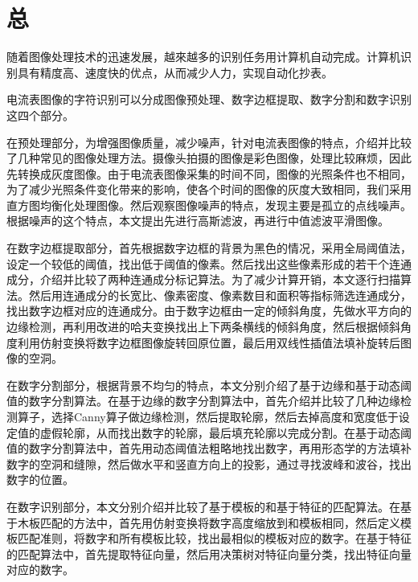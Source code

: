 
\chapter*{总}

随着图像处理技术的迅速发展，越來越多的识别任务用计算机自动完成。计算机识别具有精度高、速度快的优点，从而减少人力，实现自动化抄表。

电流表图像的字符识别可以分成图像预处理、数字边框提取、数字分割和数字识别这四个部分。

在预处理部分，为增强图像质量，减少噪声，针对电流表图像的特点，介绍并比较了几种常见的图像处理方法。摄像头拍摄的图像是彩色图像，处理比较麻烦，因此先转换成灰度图像。由于电流表图像采集的时间不同，图像的光照条件也不相同，为了减少光照条件变化带来的影响，使各个时间的图像的灰度大致相同，我们采用直方图均衡化处理图像。然后观察图像噪声的特点，发现主要是孤立的点线噪声。根据噪声的这个特点，本文提出先进行高斯滤波，再进行中值滤波平滑图像。

在数字边框提取部分，首先根据数字边框的背景为黑色的情况，采用全局阈值法，设定一个较低的阈值，找出低于阈值的像素。然后找出这些像素形成的若干个连通成分，介绍并比较了两种连通成分标记算法。为了减少计算开销，本文逐行扫描算法。然后用连通成分的长宽比、像素密度、像素数目和面积等指标筛选连通成分，找出数字边框对应的连通成分。由于数字边框由一定的倾斜角度，先做水平方向的边缘检测，再利用改进的哈夫变换找出上下两条横线的倾斜角度，然后根据倾斜角度利用仿射变换将数字边框图像旋转回原位置，最后用双线性插值法填补旋转后图像的空洞。

在数字分割部分，根据背景不均匀的特点，本文分别介绍了基于边缘和基于动态阈值的数字分割算法。在基于边缘的数字分割算法中，首先介绍并比较了几种边缘检测算子，选择Canny算子做边缘检测，然后提取轮廓，然后去掉高度和宽度低于设定值的虚假轮廓，从而找出数字的轮廓，最后填充轮廓以完成分割。在基于动态阈值的数字分割算法中，首先用动态阈值法粗略地找出数字，再用形态学的方法填补数字的空洞和缝隙，然后做水平和竖直方向上的投影，通过寻找波峰和波谷，找出数字的位置。

在数字识别部分，本文分别介绍并比较了基于模板的和基于特征的匹配算法。在基于木板匹配的方法中，首先用仿射变换将数字高度缩放到和模板相同，然后定义模板匹配准则，将数字和所有模板比较，找出最相似的模板对应的数字。在基于特征的匹配算法中，首先提取特征向量，然后用决策树对特征向量分类，找出特征向量对应的数字。